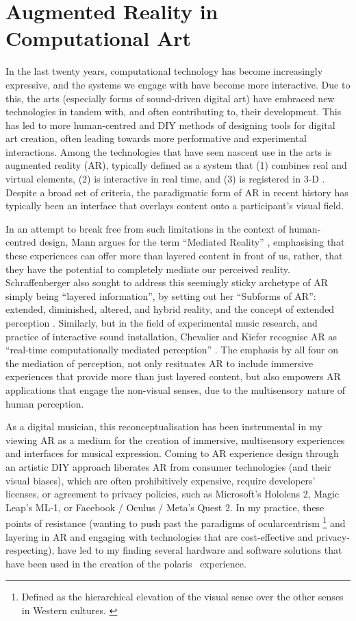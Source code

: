 \section{Augmented Reality in Computational Art}\label{sec: polaris-intro}
In the last twenty years, computational technology has become increasingly expressive, and the systems we engage with have become more interactive. Due to this, the arts (especially forms of sound-driven digital art) have embraced new technologies in tandem with, and often contributing to, their development. This has led to more human-centred and DIY methods of designing tools for digital art creation, often leading towards more performative and experimental interactions. Among the technologies that have seen nascent use in the arts is augmented reality (AR), typically defined as a system that (1) combines real and virtual elements, (2) is interactive in real time, and (3) is registered in 3-D \citep{azuma1997}. Despite a broad set of criteria, the paradigmatic form of AR in recent history has typically been an interface that overlays content onto a participant’s visual field.

In an attempt to break free from such limitations in the context of human-centred design, Mann argues for the term “Mediated Reality” \citep{mann1994}, emphasising that these experiences can offer more than layered content in front of us, rather, that they have the potential to completely mediate our perceived reality. Schraffenberger also sought to address this seemingly sticky archetype of AR simply being “layered information”, by setting out her “Subforms of AR”: extended, diminished, altered, and hybrid reality, and the concept of extended perception \citeyearpar{schraffenberger2018}. Similarly, but in the field of experimental music research, and practice of interactive sound installation, Chevalier and Kiefer recognise AR as “real-time computationally mediated perception” \citeyearpar{chevalier2020}. The emphasis by all four on the mediation of perception, not only resituates AR to include immersive experiences that provide more than just layered content, but also empowers AR applications that engage the non-visual senses, due to the multisensory nature of human perception.

As a digital musician, this reconceptualisation has been instrumental in my viewing AR as a medium for the creation of immersive, multisensory experiences and interfaces for musical expression. Coming to AR experience design through an artistic DIY approach liberates AR from consumer technologies (and their visual biases), which are often prohibitively expensive, require developers’ licenses, or agreement to privacy policies, such as Microsoft’s Hololens 2, Magic Leap’s ML-1, or Facebook / Oculus / Meta’s Quest 2. In my practice, these points of resistance (wanting to push past the paradigms of ocularcentrism \footnote{Defined as the hierarchical elevation of the visual sense over the other senses in Western cultures. \citep{oxfordreference2020}} and layering in AR and engaging with technologies that are cost-effective and privacy-respecting), have led to my finding several hardware and software solutions that have been used in the creation of the polaris~ experience.

